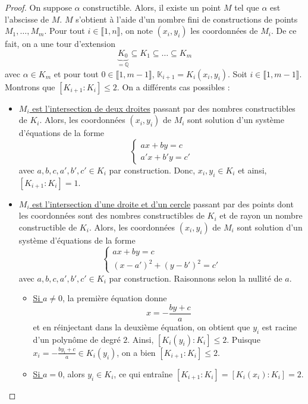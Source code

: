 
  \begin{proof}
    On suppose $\alpha$ constructible. Alors, il existe un point $M$ tel que $\alpha$ est l'abscisse de $M$. $M$ s'obtient à l'aide d'un nombre fini de constructions de points $M_1, \dots, M_m$. Pour tout $i \in \llbracket 1, n \rrbracket$, on note $(x_i, y_i)$ les coordonnées de $M_i$. De ce fait, on a une tour d'extension
    \[ \underbrace{K_0}_{= \mathbb{Q}} \subseteq K_1 \subseteq \dots \subseteq K_m \]
    avec $\alpha \in K_m$ et pour tout $0 \in \llbracket 1, m-1 \rrbracket$, $\mathbb{K}_{i+1} = K_i(x_i, y_i)$. Soit $i \in \llbracket 1, m-1 \rrbracket$. Montrons que $[K_{i+1}:K_i] \leq 2$. On a différents cas possibles :
    \begin{itemize}
      \item \uline{$M_i$ est l'intersection de deux droites} passant par des nombres constructibles de $K_i$. Alors, les coordonnées $(x_i, y_i)$ de $M_i$ sont solution d'un système d'équations de la forme
      \[
        \begin{cases}
          ax + by = c \\
          a'x + b'y = c'
        \end{cases}
      \]
      avec $a, b, c, a', b', c' \in K_i$ par construction. Donc, $x_i, y_i \in K_i$ et ainsi, $[K_{i+1}:K_i] = 1$.
      \item \uline{$M_i$ est l'intersection d'une droite et d'un cercle} passant par des points dont les coordonnées sont des nombres constructibles de $K_i$ et de rayon un nombre constructible de $K_i$. Alors, les coordonnées $(x_i, y_i)$ de $M_i$ sont solution d'un système d'équations de la forme
      \[
        \begin{cases}
          ax + by = c \\
          (x-a')^2 + (y-b')^2 = c'
        \end{cases}
      \]
      avec $a, b, c, a', b', c' \in K_i$ par construction. Raisonnons selon la nullité de $a$.
      \begin{itemize}
        \item \uline{Si $a \neq 0$}, la première équation donne
        \[ x = -\frac{by+c}{a} \]
        et en réinjectant dans la deuxième équation, on obtient que $y_i$ est racine d'un polynôme de degré $2$. Ainsi, $[K_i(y_i) : K_i] \leq 2$. Puisque $x_i = -\frac{by_i+c}{a} \in K_i(y_i)$, on a bien $[K_{i+1}:K_i] \leq 2$.
        \item \uline{Si $a = 0$}, alors $y_i \in K_i$, ce qui entraîne $[K_{i+1}:K_i] = [K_i(x_i):K_i] = 2$.

\end{itemize}
\end{itemize}
\end{proof}
